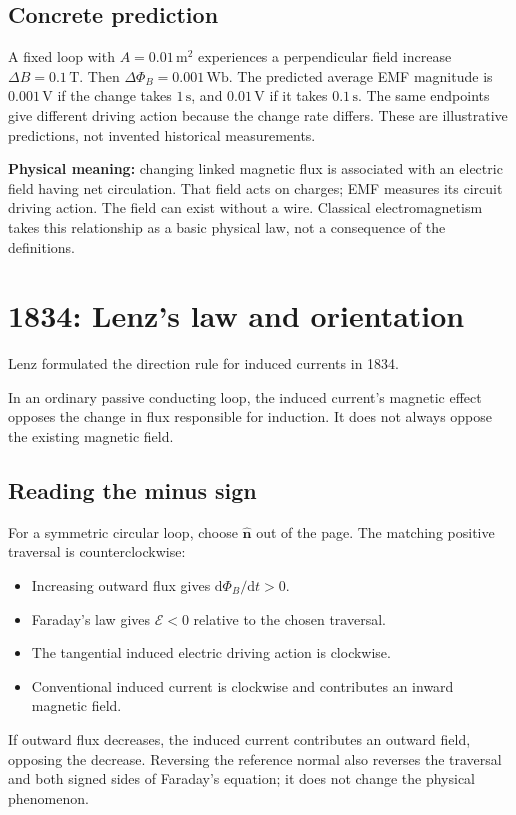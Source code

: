 \documentclass[11pt,letterpaper]{article}
\newcommand{\vect}[1]{\boldsymbol{#1}}
\newcommand{\idea}[1]{\par\smallskip\noindent\colorbox{pale}{\parbox{\dimexpr\linewidth-2\fboxsep\relax}{#1}}\par\smallskip}
\begin{document}
\subsection*{Concrete prediction}
A fixed loop with $A=0.01\,\mathrm{m^2}$ experiences a perpendicular field increase $\Delta B=0.1\,\mathrm T$. Then $\Delta\Phi_B=0.001\,\mathrm{Wb}$. The predicted average EMF magnitude is $0.001\,\mathrm V$ if the change takes $1\,\mathrm s$, and $0.01\,\mathrm V$ if it takes $0.1\,\mathrm s$. The same endpoints give different driving action because the change rate differs. These are illustrative predictions, not invented historical measurements.

\idea{\textbf{Physical meaning:} changing linked magnetic flux is associated with an electric field having net circulation. That field acts on charges; EMF measures its circuit driving action. The field can exist without a wire. Classical electromagnetism takes this relationship as a basic physical law, not a consequence of the definitions.\cite{inducedE}}

\newpage
\section{1834: Lenz's law and orientation}
Lenz formulated the direction rule for induced currents in 1834.\cite{lenz}

In an ordinary passive conducting loop, the induced current's magnetic effect opposes the change in flux responsible for induction. It does not always oppose the existing magnetic field.

\subsection*{Reading the minus sign}
For a symmetric circular loop, choose $\hat{\vect n}$ out of the page. The matching positive traversal is counterclockwise:
\begin{itemize}
\item Increasing outward flux gives $\mathrm d\Phi_B/\mathrm dt>0$.
\item Faraday's law gives $\mathcal E<0$ relative to the chosen traversal.
\item The tangential induced electric driving action is clockwise.
\item Conventional induced current is clockwise and contributes an inward magnetic field.
\end{itemize}
If outward flux decreases, the induced current contributes an outward field, opposing the decrease. Reversing the reference normal also reverses the traversal and both signed sides of Faraday's equation; it does not change the physical phenomenon.
\end{document}
